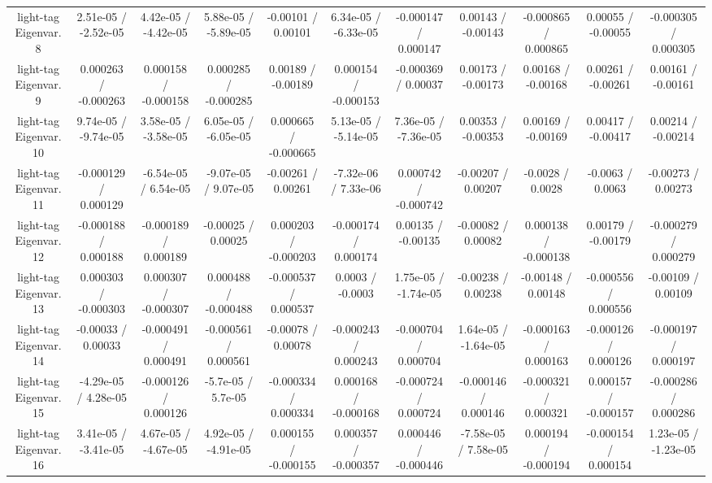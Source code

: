 \begin{table}[htbp]
\begin{center}
\begin{tabular}{|c|c|c|c|c|c|c|c|c|c|c|}
  light-tag Eigenvar. 8 & 2.51e-05 / -2.52e-05 & 4.42e-05 / -4.42e-05 & 5.88e-05 / -5.89e-05 & -0.00101 / 0.00101 & 6.34e-05 / -6.33e-05 & -0.000147 / 0.000147 & 0.00143 / -0.00143 & -0.000865 / 0.000865 & 0.00055 / -0.00055 & -0.000305 / 0.000305 \\ 
  light-tag Eigenvar. 9 & 0.000263 / -0.000263 & 0.000158 / -0.000158 & 0.000285 / -0.000285 & 0.00189 / -0.00189 & 0.000154 / -0.000153 & -0.000369 / 0.00037 & 0.00173 / -0.00173 & 0.00168 / -0.00168 & 0.00261 / -0.00261 & 0.00161 / -0.00161 \\ 
  light-tag Eigenvar. 10 & 9.74e-05 / -9.74e-05 & 3.58e-05 / -3.58e-05 & 6.05e-05 / -6.05e-05 & 0.000665 / -0.000665 & 5.13e-05 / -5.14e-05 & 7.36e-05 / -7.36e-05 & 0.00353 / -0.00353 & 0.00169 / -0.00169 & 0.00417 / -0.00417 & 0.00214 / -0.00214 \\ 
  light-tag Eigenvar. 11 & -0.000129 / 0.000129 & -6.54e-05 / 6.54e-05 & -9.07e-05 / 9.07e-05 & -0.00261 / 0.00261 & -7.32e-06 / 7.33e-06 & 0.000742 / -0.000742 & -0.00207 / 0.00207 & -0.0028 / 0.0028 & -0.0063 / 0.0063 & -0.00273 / 0.00273 \\ 
  light-tag Eigenvar. 12 & -0.000188 / 0.000188 & -0.000189 / 0.000189 & -0.00025 / 0.00025 & 0.000203 / -0.000203 & -0.000174 / 0.000174 & 0.00135 / -0.00135 & -0.00082 / 0.00082 & 0.000138 / -0.000138 & 0.00179 / -0.00179 & -0.000279 / 0.000279 \\ 
  light-tag Eigenvar. 13 & 0.000303 / -0.000303 & 0.000307 / -0.000307 & 0.000488 / -0.000488 & -0.000537 / 0.000537 & 0.0003 / -0.0003 & 1.75e-05 / -1.74e-05 & -0.00238 / 0.00238 & -0.00148 / 0.00148 & -0.000556 / 0.000556 & -0.00109 / 0.00109 \\ 
  light-tag Eigenvar. 14 & -0.00033 / 0.00033 & -0.000491 / 0.000491 & -0.000561 / 0.000561 & -0.00078 / 0.00078 & -0.000243 / 0.000243 & -0.000704 / 0.000704 & 1.64e-05 / -1.64e-05 & -0.000163 / 0.000163 & -0.000126 / 0.000126 & -0.000197 / 0.000197 \\ 
  light-tag Eigenvar. 15 & -4.29e-05 / 4.28e-05 & -0.000126 / 0.000126 & -5.7e-05 / 5.7e-05 & -0.000334 / 0.000334 & 0.000168 / -0.000168 & -0.000724 / 0.000724 & -0.000146 / 0.000146 & -0.000321 / 0.000321 & 0.000157 / -0.000157 & -0.000286 / 0.000286 \\ 
  light-tag Eigenvar. 16 & 3.41e-05 / -3.41e-05 & 4.67e-05 / -4.67e-05 & 4.92e-05 / -4.91e-05 & 0.000155 / -0.000155 & 0.000357 / -0.000357 & 0.000446 / -0.000446 & -7.58e-05 / 7.58e-05 & 0.000194 / -0.000194 & -0.000154 / 0.000154 & 1.23e-05 / -1.23e-05 \\ 

\end{tabular}
\end{center}
\end{table}
